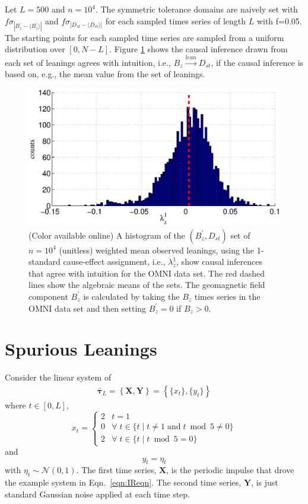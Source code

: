 \documentclass[a4paper,11pt,twocolumn]{article}
\begin{document}
Let $L=500$ and $n=10^4$.  The symmetric tolerance domains are naively set with $f\sigma_{|B_{z}^\prime-\langle B_{z}^\prime\rangle|}$ and $f\sigma_{|D_{st}-\langle D_{st}\rangle|}$ for each sampled times series of length $L$ with f=0.05.  The starting points for each sampled time series are sampled from a uniform distribution over $[0,N-L]$.  Figure \ref{fig:dsthist} shows the causal inference drawn from each set of leanings agrees with intuition, i.e., $B_{z}\xrightarrow{lean}D_{st}$, if the causal inference is based on, e.g., the mean value from the set of leanings.  
\begin{figure}[ht]
\includegraphics[scale=0.40]{SolarDataBzNormDst.eps} 
\caption{(Color available online) A histogram of the $(B_z^\prime,D_{st})$ set of $n=10^4$ (unitless) weighted mean observed leanings, using the 1-standard cause-effect assignment, i.e., $\lambda^1_{z}$, show causal inferences that agree with intuition for the OMNI data set.  The red dashed lines show the algebraic means of the sets.  The geomagnetic field component $B_z^\prime$ is calculated by taking the $B_z$ times series in the OMNI data set and then setting $B_z^\prime = 0$ if $B_z>0$.}
\label{fig:dsthist}
\end{figure}

\section{Spurious Leanings}
Consider the linear system of
\begin{eqnarray}
\label{eqn:Spur}
\bar{\mathbf{\tau}}_L = \left\{\mathbf{X},\mathbf{Y}\right\} = \left\{\{x_t\},\{y_t\}\right\}
\end{eqnarray}
where $t\in[0,L]$,
\begin{equation*}
x_t = \left\{
  \begin{array}{lr}
    2 & t = 1\\
    0 & \forall\; t\in\{t\;|\;t\neq 1 \;\mathrm{and}\; t\bmod 5 \neq 0\}\\
    2 & \forall\; t\in\{t\;|\;t\bmod 5 = 0\}
  \end{array}
\right.
\end{equation*}
and
\begin{equation*}
y_t = \eta_t
\end{equation*}
with $\eta_t\sim\mathcal{N}\left(0,1\right)$.  The first time series, $\mathbf{X}$, is the periodic impulse that drove the example system in Eqn.\ \ref{eqn:IReqn}.  The second time series, $\mathbf{Y}$, is just standard Gaussian noise applied at each time step.  
\end{document}
